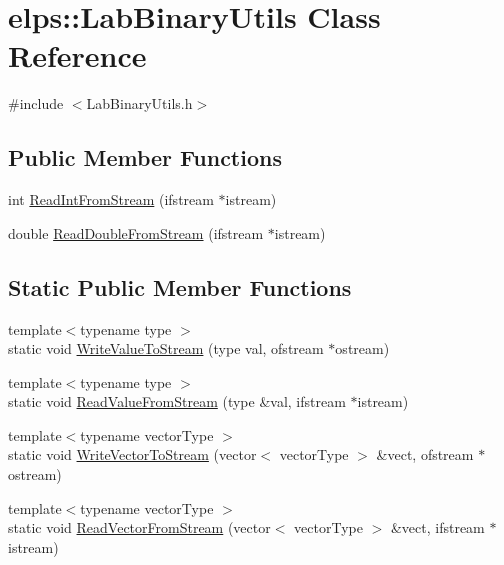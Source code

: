 \hypertarget{classelps_1_1_lab_binary_utils}{\section{elps\+:\+:Lab\+Binary\+Utils Class Reference}
\label{classelps_1_1_lab_binary_utils}
}


{\ttfamily \#include $<$Lab\+Binary\+Utils.\+h$>$}

\subsection*{Public Member Functions}
\begin{DoxyCompactItemize}
\item 
int \hyperlink{classelps_1_1_lab_binary_utils_a8106920687a59f85c301514d3a60fc32}{Read\+Int\+From\+Stream} (ifstream $\ast$istream)
\item 
double \hyperlink{classelps_1_1_lab_binary_utils_a086e10166668484dbc4f8ea5677dff58}{Read\+Double\+From\+Stream} (ifstream $\ast$istream)
\end{DoxyCompactItemize}
\subsection*{Static Public Member Functions}
\begin{DoxyCompactItemize}
\item 
{\footnotesize template$<$typename type $>$ }\\static void \hyperlink{classelps_1_1_lab_binary_utils_a2c5e61ad5108cbaf5ac2e757ab5d3475}{Write\+Value\+To\+Stream} (type val, ofstream $\ast$ostream)
\item 
{\footnotesize template$<$typename type $>$ }\\static void \hyperlink{classelps_1_1_lab_binary_utils_aacefd0e197978750669d1dde4634ba5c}{Read\+Value\+From\+Stream} (type \&val, ifstream $\ast$istream)
\item 
{\footnotesize template$<$typename vector\+Type $>$ }\\static void \hyperlink{classelps_1_1_lab_binary_utils_a0df99bc2f26dd144c1a598c4bc943ca7}{Write\+Vector\+To\+Stream} (vector$<$ vector\+Type $>$ \&vect, ofstream $\ast$ostream)
\item 
{\footnotesize template$<$typename vector\+Type $>$ }\\static void \hyperlink{classelps_1_1_lab_binary_utils_ad681309551b853645cb6aea77126a871}{Read\+Vector\+From\+Stream} (vector$<$ vector\+Type $>$ \&vect, ifstream $\ast$istream)
\end{DoxyCompactItemize}


